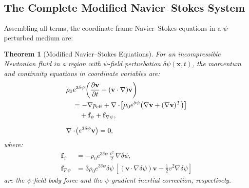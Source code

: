 \documentclass[12pt,twocolumn]{article}
\newcommand{\Reff}{\mathrm{eff}}
\newcommand{\vvec}{\mathbf{v}}
\newcommand{\xvec}{\mathbf{x}}
\newcommand{\fvec}{\mathbf{f}}
\newcommand{\dpsi}{\delta\psi}
\newcommand{\half}{\tfrac{1}{2}}
\newtheorem{theorem}{Theorem}
\begin{document}
\subsection{The Complete Modified Navier--Stokes System}
\label{sec:full_ns}

Assembling all terms, the coordinate-frame Navier--Stokes equations in a
$\psi$-perturbed medium are:

\begin{theorem}[Modified Navier--Stokes Equations]
\label{thm:mod_ns}
For an incompressible Newtonian fluid in a region with $\psi$-field
perturbation $\dpsi(\xvec,t)$, the momentum and continuity equations in
coordinate variables are:
\begin{align}
&\rho_0 e^{3\dpsi}\!\left(\frac{\partial\vvec}{\partial t}
+ (\vvec\cdot\nabla)\vvec\right) \notag\\
&\quad= -\nabla p_\Reff + \nabla\cdot\!\left[\mu_0 e^{\dpsi}
\!\left(\nabla\vvec + (\nabla\vvec)^T\right)\right] \notag\\
&\quad\quad + \fvec_\psi + \fvec_{\nabla\psi},
\label{eq:full_ns}\\[6pt]
&\nabla\cdot\!\left(e^{3\dpsi}\vvec\right) = 0,
\label{eq:full_cont}
\end{align}
where:
\begin{align}
\fvec_\psi &= -\rho_0 e^{3\dpsi}\,\frac{c^2}{2}\,\nabla\dpsi,
\label{eq:f_psi}\\
\fvec_{\nabla\psi} &= 3\rho_0 e^{3\dpsi}\dpsi\,
\left[(\vvec\cdot\nabla\dpsi)\vvec
- \half v^2\nabla\dpsi\right]
\label{eq:f_gradpsi}
\end{align}
are the $\psi$-field body force and the $\psi$-gradient inertial correction,
respectively.
\end{theorem}
\end{document}
